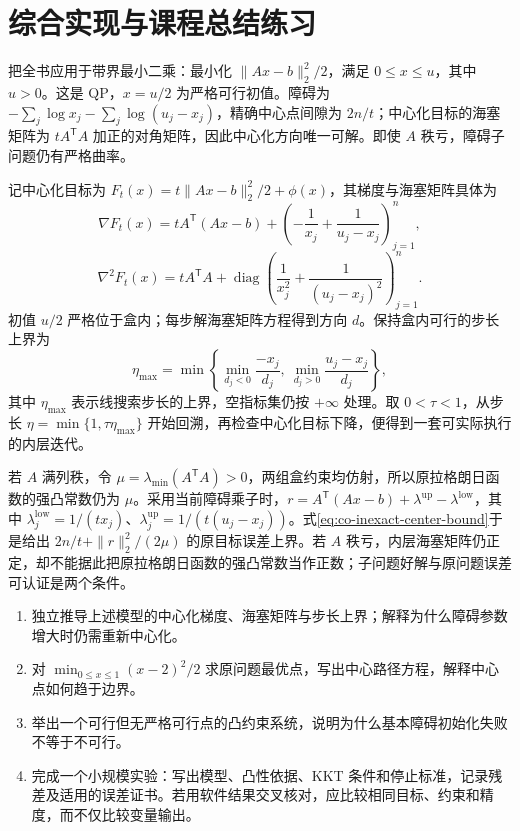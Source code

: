\section{综合实现与课程总结练习}

把全书应用于带界最小二乘：最小化 $\|Ax-b\|_2^2/2$，满足 $0\leq x\leq u$，其中 $u>0$。这是 QP，$x=u/2$ 为严格可行初值。障碍为 $-\sum_j\log x_j-\sum_j\log(u_j-x_j)$，精确中心点间隙为 $2n/t$；中心化目标的海塞矩阵为 $tA^{\mathsf T}A$ 加正的对角矩阵，因此中心化方向唯一可解。即使 $A$ 秩亏，障碍子问题仍有严格曲率。

记中心化目标为 $F_t(x)=t\|Ax-b\|_2^2/2+\phi(x)$，其梯度与海塞矩阵具体为
\[
 \nabla F_t(x)=tA^{\mathsf T}(Ax-b)
  +\left(-\frac1{x_j}+\frac1{u_j-x_j}\right)_{j=1}^n,
\]
\[
 \nabla^2F_t(x)=tA^{\mathsf T}A+
 \operatorname{diag}\left(\frac1{x_j^2}+\frac1{(u_j-x_j)^2}\right)_{j=1}^n.
\]
初值 $u/2$ 严格位于盒内；每步解海塞矩阵方程得到方向 $d$。保持盒内可行的步长上界为
\[
 \eta_{\max}=\min\left\{
 \min_{d_j<0}\frac{-x_j}{d_j},
 \ \min_{d_j>0}\frac{u_j-x_j}{d_j}
 \right\},
\]
其中 $\eta_{\max}$ 表示线搜索步长的上界，空指标集仍按 $+\infty$ 处理。取 $0<\tau<1$，从步长 $\eta=\min\{1,\tau\eta_{\max}\}$ 开始回溯，再检查中心化目标下降，便得到一套可实际执行的内层迭代。

若 $A$ 满列秩，令 $\mu=\lambda_{\min}(A^{\mathsf T}A)>0$，两组盒约束均仿射，所以原拉格朗日函数的强凸常数仍为 $\mu$。采用当前障碍乘子时，$r=A^{\mathsf T}(Ax-b)+\lambda^{\mathrm{up}}-\lambda^{\mathrm{low}}$，其中 $\lambda_j^{\mathrm{low}}=1/(tx_j)$、$\lambda_j^{\mathrm{up}}=1/(t(u_j-x_j))$。式\eqref{eq:co-inexact-center-bound}于是给出 $2n/t+\|r\|_2^2/(2\mu)$ 的原目标误差上界。若 $A$ 秩亏，内层海塞矩阵仍正定，却不能据此把原拉格朗日函数的强凸常数当作正数；子问题好解与原问题误差可认证是两个条件。

\begin{enumerate}
 \item 独立推导上述模型的中心化梯度、海塞矩阵与步长上界；解释为什么障碍参数增大时仍需重新中心化。
 \item 对 $\min_{0\leq x\leq1}(x-2)^2/2$ 求原问题最优点，写出中心路径方程，解释中心点如何趋于边界。
 \item 举出一个可行但无严格可行点的凸约束系统，说明为什么基本障碍初始化失败不等于不可行。
 \item 完成一个小规模实验：写出模型、凸性依据、KKT 条件和停止标准，记录残差及适用的误差证书。若用软件结果交叉核对，应比较相同目标、约束和精度，而不仅比较变量输出。
\end{enumerate}

